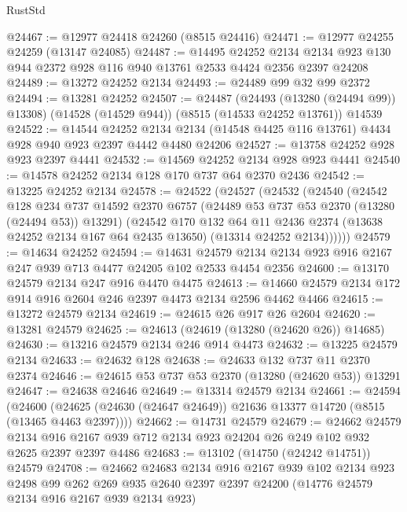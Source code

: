 \begin{lexlean}{RustStd}
\begin{coremodule}
@24467 := @12977 @24418 @24260 (@8515 @24416)
@24471 := @12977 @24255 @24259 (@13147 @24085)
@24487 := @14495
    @24252
    @2134
    @2134
    @923
    @130
    @944
    @2372
    @928
    @116
    @940
    @13761
    @2533
    @4424
    @2356
    @2397
    @24208
@24489 := @13272 @24252 @2134
@24493 := @24489 @99 @32 @99 @2372
@24494 := @13281 @24252
@24507 := @24487
    (@24493 (@13280 (@24494 @99)) @13308)
    (@14528 (@14529 @944))
    (@8515 (@14533 @24252 @13761))
    @14539
@24522 := @14544
    @24252
    @2134
    @2134
    (@14548 @4425 @116 @13761)
    @4434
    @928
    @940
    @923
    @2397
    @4442
    @4480
    @24206
@24527 := @13758 @24252 @928 @923 @2397 @4441
@24532 := @14569 @24252 @2134 @928 @923 @4441
@24540 := @14578 @24252 @2134 @128 @170 @737 @64 @2370 @2436
@24542 := @13225 @24252 @2134
@24578 := @24522
    (@24527
      (@24532
        (@24540
          (@24542
            @128
            @234
            @737
            @14592
            @2370
            @6757
            (@24489 @53 @737 @53 @2370 (@13280 (@24494 @53)) @13291)
            (@24542
              @170
              @132
              @64
              @11
              @2436
              @2374
              (@13638 @24252 @2134 @167 @64 @2435 @13650)
              (@13314 @24252 @2134))))))
@24579 := @14634 @24252
@24594 := @14631
    @24579
    @2134
    @2134
    @923
    @916
    @2167
    @247
    @939
    @713
    @4477
    @24205
    @102
    @2533
    @4454
    @2356
@24600 := @13170 @24579 @2134 @247 @916 @4470 @4475
@24613 := @14660 @24579 @2134 @172 @914 @916 @2604 @246 @2397 @4473 @2134 @2596 @4462 @4466
@24615 := @13272 @24579 @2134
@24619 := @24615 @26 @917 @26 @2604
@24620 := @13281 @24579
@24625 := @24613 (@24619 (@13280 (@24620 @26)) @14685)
@24630 := @13216 @24579 @2134 @246 @914 @4473
@24632 := @13225 @24579 @2134
@24633 := @24632 @128
@24638 := @24633 @132 @737 @11 @2370 @2374
@24646 := @24615 @53 @737 @53 @2370 (@13280 (@24620 @53)) @13291
@24647 := @24638 @24646
@24649 := @13314 @24579 @2134
@24661 := @24594
    (@24600 (@24625 (@24630 (@24647 @24649)) @21636 @13377 @14720 (@8515 (@13465 @4463 @2397))))
@24662 := @14731 @24579
@24679 := @24662
    @24579
    @2134
    @916
    @2167
    @939
    @712
    @2134
    @923
    @24204
    @26
    @249
    @102
    @932
    @2625
    @2397
    @2397
    @4486
@24683 := @13102 (@14750 (@24242 @14751)) @24579
@24708 := @24662
    @24683
    @2134
    @916
    @2167
    @939
    @102
    @2134
    @923
    @2498
    @99
    @262
    @269
    @935
    @2640
    @2397
    @2397
    @24200
    (@14776 @24579 @2134 @916 @2167 @939 @2134 @923)

\end{coremodule}
\end{lexlean}

